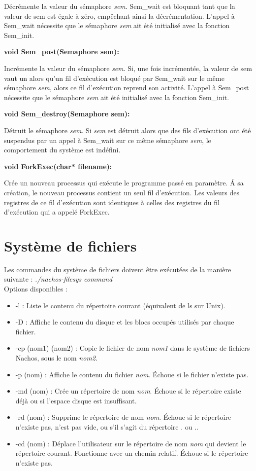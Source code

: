 \documentclass[12pt]{report}
\begin{document}
Décrémente la valeur du sémaphore \textit{sem}. Sem\_wait est bloquant tant que la valeur de sem est égale à zéro, empêchant ainsi la décrémentation.
L'appel à Sem\_wait nécessite que le sémaphore \textit{sem} ait été initialisé avec la fonction Sem\_init.
\bigskip


\textbf{void Sem\_post(Semaphore sem):}

Incrémente la valeur du sémaphore \textit{sem}. Si, une fois incrémentée, la valeur de sem vaut un alors qu'un fil d'exécution est bloqué par Sem\_wait sur le même sémaphore \textit{sem}, alors ce fil d'exécution reprend son activité.
L'appel à Sem\_post nécessite que le sémaphore \textit{sem} ait été initialisé avec la fonction Sem\_init.
\bigskip


\textbf{void Sem\_destroy(Semaphore sem):}

Détruit le sémaphore \textit{sem}. Si \textit{sem} est détruit alors que des fils d'exécution ont été suspendus par un appel à Sem\_wait sur ce même sémaphore \textit{sem}, le comportement du système est indéfini.
\bigskip


\textbf{void ForkExec(char* filename):}

Crée un nouveau processus qui exécute le programme passé en paramètre. \'A sa création, le nouveau processus contient un seul fil d'exécution. Les valeurs des registres de ce fil d'exécution sont identiques à celles des registres du fil d'exécution qui a appelé ForkExec.
\bigskip


\section{Système de fichiers}

Les commandes du système de fichiers doivent être exécutées de la manière suivante :
\textit{./nachos-filesys command}\\

Options disponibles :\\
\begin{itemize}\renewcommand{\labelitemi}{$\bullet$}
\item -l  : Liste le contenu du répertoire courant (équivalent de ls sur Unix).
\item  -D  : Affiche le contenu du disque et les blocs occupés utilisés par chaque fichier.
\item  -cp (nom1) (nom2) : Copie le fichier de nom \textit{nom1} dans le système de fichiers Nachos, sous le nom \textit{nom2}.
\item  -p (nom) : Affiche le contenu du fichier \textit{nom}. Échoue si le fichier n'existe pas.
\item  -md (nom) : Crée un répertoire de nom \textit{nom}. Échoue si le répertoire existe déjà ou si l'espace disque est insuffisant.
\item  -rd (nom) : Supprime le répertoire de nom \textit{nom}. Échoue si le répertoire n'existe pas, n'est pas vide, ou s'il s'agit du répertoire . ou ..
\item -cd (nom) : Déplace l'utilisateur sur le répertoire de nom \textit{nom} qui devient le répertoire courant. Fonctionne avec un chemin relatif. Échoue si le répertoire n'existe pas.
\end{itemize}
\end{document}
